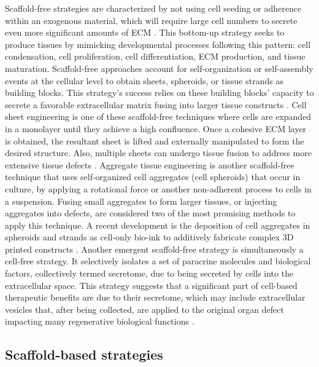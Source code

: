 Scaffold-free strategies are characterized by not using cell seeding or adherence within an exogenous material, which will require large cell numbers to secrete even more significant amounts of \ac{ECM} \cite{DuRaine2015-fu}. This bottom-up strategy seeks to produce tissues by mimicking developmental processes following this pattern: cell condensation, cell proliferation, cell differentiation, \ac{ECM} production, and tissue maturation. Scaffold-free approaches account for self-organization or self-assembly events at the cellular level to obtain sheets, spheroids, or tissue strands as building blocks. This strategy's success relies on these building blocks' capacity to secrete a favorable extracellular matrix fusing into larger tissue constructs \cite{Dissanayaka2020-ig}. Cell sheet engineering is one of these scaffold-free techniques where cells are expanded in a monolayer until they achieve a high confluence. Once a cohesive \ac{ECM} layer is obtained, the resultant sheet is lifted and externally manipulated to form the desired structure. Also, multiple sheets can undergo tissue fusion to address more extensive tissue defects \cite{DuRaine2015-fu}. Aggregate tissue engineering is another scaffold-free technique that uses self-organized cell aggregates (cell spheroids) that occur in culture, by applying a rotational force or another non-adherent process to cells in a suspension. Fusing small aggregates to form larger tissues, or injecting aggregates into defects, are considered two of the most promising methods to apply this technique. A recent development is the deposition of cell aggregates in spheroids and strands as cell-only bio-ink to additively fabricate complex \ac{3D} printed constructs \cite{Khoshnood2020-ll}. Another emergent scaffold-free strategy is simultaneously a cell-free strategy. It selectively isolates a set of paracrine molecules and biological factors, collectively termed secretome, due to being secreted by cells into the extracellular space. This strategy suggests that a significant part of cell-based therapeutic benefits are due to their secretome, which may include extracellular vesicles that, after being collected, are applied to the original organ defect impacting many regenerative biological functions \cite{Daneshmandi2020-nn}.


\subsection{Scaffold-based strategies}

